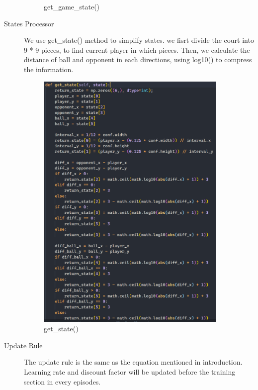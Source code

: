 \documentclass[14pt]{extarticle}
\begin{document}
\begin{description}
\begin{figure}[H]
\begin{center}
			\caption{get\_game\_state()}
		\end{center}
	\end{figure} 
    \item[States Processor]
    We use get\_state() method to simplify states. we fisrt divide the court into 9 * 9 pieces, to find current player in which pieces. Then, we calculate the distance of ball and opponent in each directions, using log10() to compress the information.
    \begin{figure}[H]
		\begin{center}
			\includegraphics[width=0.9\textwidth]{simplify_state.png}
			\caption{get\_state()}
		\end{center}
	\end{figure} 
    \item[Update Rule]
    The update rule is the same as the equation mentioned in introduction. Learning rate and discount factor will be updated before the training section in every episodes.
    \begin{figure}[H]
		\begin{center}

\end{center}
\end{figure}
\end{description}
\end{document}
